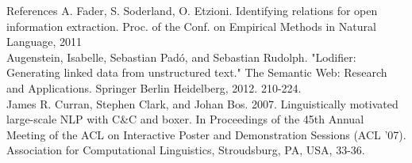 \documentclass[11pt]{beamer}
\begin{document}
	\begin{frame}[allowframebreaks]{References}
		A. Fader, S. Soderland, O. Etzioni. Identifying relations for open information extraction. Proc. of the Conf. on Empirical Methods in Natural Language, 2011\\
		\vspace{7pt}
		Augenstein, Isabelle, Sebastian Padó, and Sebastian Rudolph. "Lodifier: Generating linked data from unstructured text." The Semantic Web: Research and Applications. Springer Berlin Heidelberg, 2012. 210-224.\\
		\framebreak
		James R. Curran, Stephen Clark, and Johan Bos. 2007. Linguistically motivated large-scale NLP with C\&C and boxer. In Proceedings of the 45th Annual Meeting of the ACL on Interactive Poster and Demonstration Sessions (ACL '07). Association for Computational Linguistics, Stroudsburg, PA, USA, 33-36.\\
		\vspace{7pt}
	\end{frame}
\end{document}
